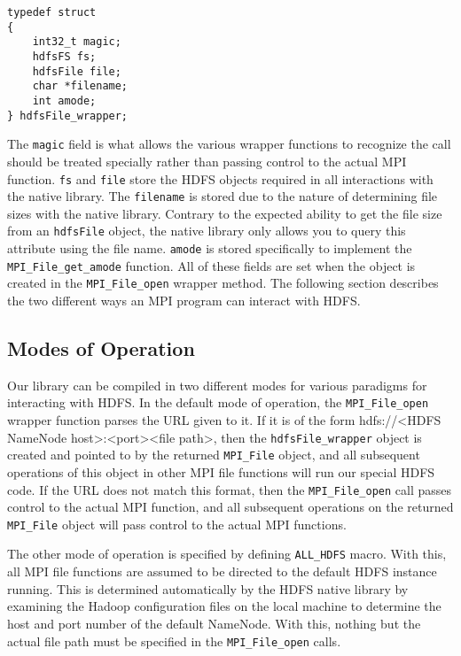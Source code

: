 \begin{lstlisting}
typedef struct
{
	int32_t magic;
	hdfsFS fs;
	hdfsFile file;
	char *filename;
	int amode;
} hdfsFile_wrapper;
\end{lstlisting}

The \texttt{magic} field is what allows the various wrapper functions to
recognize the call should be treated specially rather than passing control to
the actual MPI function. \texttt{fs} and \texttt{file} store the HDFS objects
required in all interactions with the native library. The \texttt{filename} is
stored due to the nature of determining file sizes with the native library.
Contrary to the expected ability to get the file size from an \texttt{hdfsFile}
object, the native library only allows you to query this attribute using the
file name. \texttt{amode} is stored specifically to implement the
\texttt{MPI\_File\_get\_amode} function. All of these fields are set when the
object is created in the \texttt{MPI\_File\_open} wrapper method. The following
section describes the two different ways an MPI program can interact with HDFS.

\subsection{Modes of Operation}
Our library can be compiled in two different modes for various paradigms for
interacting with HDFS. In the default mode of operation, the
\texttt{MPI\_File\_open} wrapper function parses the URL given to it. If it is
of the form hdfs://<HDFS NameNode host>:<port><file path>, then the
\texttt{hdfsFile\_wrapper} object is created and pointed to by the returned
\texttt{MPI\_File} object, and all subsequent operations of this object in other
MPI file functions will run our special HDFS code. If the URL does not match
this format, then the \texttt{MPI\_File\_open} call passes control to the actual
MPI function, and all subsequent operations on the returned \texttt{MPI\_File}
object will pass control to the actual MPI functions. 

The other mode of operation is specified by defining \texttt{ALL\_HDFS} macro.
With this, all MPI file functions are assumed to be directed to the default HDFS
instance running. This is determined automatically by the HDFS native library by
examining the Hadoop configuration files on the local machine to determine the
host and port number of the default NameNode. With this, nothing but the actual
file path must be specified in the \texttt{MPI\_File\_open} calls. 

